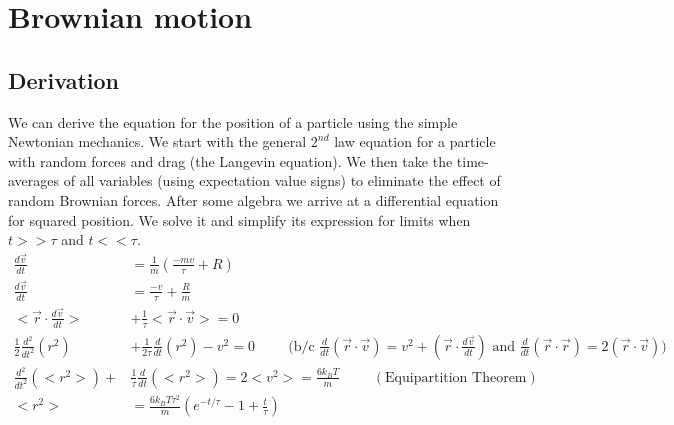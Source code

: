 \documentclass[10pt]{article} %
\begin{document}

\section{Brownian motion}
\subsection{Derivation} \label{sec:bmotion-derivation}
We can derive the equation for the position of a particle using the simple Newtonian mechanics. We
start with the general $2^{nd}$ law equation for a particle with random forces and drag (the
Langevin equation). We then take the time-averages of all variables (using expectation value signs)
to eliminate the effect of random Brownian forces. After some algebra we arrive at a differential
equation for squared position. We solve it and simplify its expression for limits when $t >> \tau$
and $t << \tau$.\\

\begin{align*}
  \frac{d\vec{v}}{dt} &= \frac{1}{m}\left(\frac{-mv}{\tau} + R\right)\\
  \frac{d\vec{v}}{dt} &= \frac{-v}{\tau} + \frac{R}{m}\\
  <\vec{r} \cdot \frac{d\vec{v}}{dt} > &+ \frac{1}{\tau}<\vec{r} \cdot \vec{v}> = 0\\
  \frac{1}{2}\frac{d^2}{dt^2}(r^2) &+ \frac{1}{2\tau}\frac{d}{dt}(r^2) - v^2 = 0 \hspace{1cm} \Bigg(\mbox{b/c }\frac{d}{dt}\left(\vec{r} \cdot \vec{v}\right) = v^2 + \left(\vec{r} \cdot \frac{d\vec{v}}{dt}\right)
  \mbox{ and }
  \frac{d}{dt}\left(\vec{r} \cdot \vec{r}\right) = 2\left(\vec{r} \cdot \vec{v}\right) \Bigg)\\
  \frac{d^2}{dt^2}(<r^2>) + &\frac{1}{\tau}\frac{d}{dt}(<r^2>) = 2<v^2> = \frac{6k_BT}{m} \hspace{1cm}\left(\mbox{Equipartition Theorem}\right)\\
  <r^2> &= \frac{6k_BT\tau^2}{m}\left(e^{-t/\tau}-1+\frac{t}{\tau}\right)\\
\end{align*}
\end{document}
